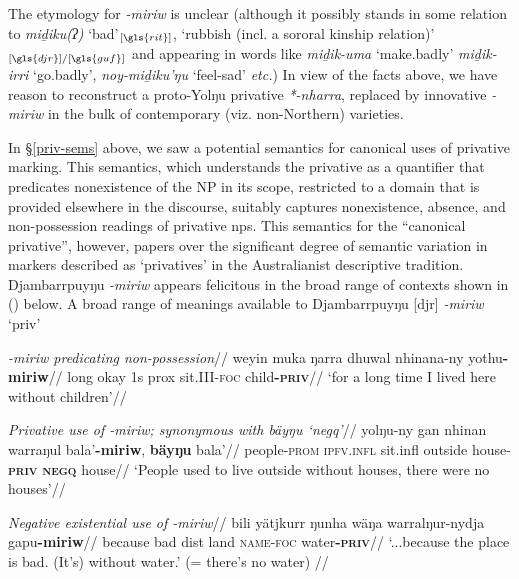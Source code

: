 \documentclass[usenames,dvipsnames,11pt]{article}
\begin{document}
{The etymology for \textit{-miriw} is unclear (although it possibly stands in some relation to \textit{miḏiku(ʔ)} `bad'$_{[\gls{rit}]}$, `rubbish (incl. a sororal kinship relation)'$_{[\gls{djr}]/[\gls{guf}]}$ and appearing in words like \textit{miḏik-uma} `make.badly' \textit{miḏik-irri} `go.badly', \textit{noy-miḏiku'ŋu} `feel-sad' \textit{etc.}) In view of the facts above, we have reason to reconstruct a proto-Yolŋu privative \textit{*-nharra}, replaced by innovative \textit{-miriw} in the bulk of contemporary (viz. non-Northern) varieties.

In §\ref{priv-sems} above, we saw a potential semantics for canonical uses of privative marking. This semantics, which understands the privative as a quantifier that predicates nonexistence of the NP in its scope, restricted to a domain that is provided elsewhere in the discourse, suitably captures nonexistence, absence, and non-possession readings of privative \gls{np}s. This semantics for the ``canonical privative'', however, papers over the significant degree of semantic variation in markers described as `privatives' in the Australianist descriptive tradition. Djambarrpuyŋu \textit{-miriw} appears felicitous in the broad range of contexts shown in (\nextx) below.
\pex A broad range of meanings available to Djambarrpuyŋu [\gls{djr}] \textit{-miriw} `\gls{priv}' 

\a\begingl\glpreamble \textit{\emph{-miriw} predicating non-possession}//
\gla weyin muka ŋarra dhuwal nhinana-ny yothu\textbf{-miriw}//
\glb long okay 1s \gls{prox} sit.III-\textsc{foc} child\textsc{\textbf{-priv}}//
\glft`for a long time I lived here without children'//\endgl

\a\begingl\glpreamble \textit{Privative use of \emph{-miriw}; synonymous with \em{bäyŋu} `\gls{negq}'}//
\gla yolŋu-ny gan nhinan warraŋul bala'\textbf{-miriw}, \textbf{bäyŋu} bala'//
\glb people-\textsc{prom} \textsc{ipfv.infl} sit.\gls{infl} outside house\textsc{-\textbf{priv}} \textsc{\textbf{negq}} house//
\glft `People used to live outside without houses, there were no houses'//
\endgl

\a\begingl\glpreamble \textit{Negative existential use of \emph{-miriw}}//
\gla bili yätjkurr ŋunha wäŋa warralŋur-nydja gapu\textbf{-miriw}//
\glb because bad \gls{dist} land \textsc{name-foc} water\textsc{\textbf{-priv}}//
\glft `...because the place is bad. (It's) without water.' (= there's no water) 		//
\endgl

}
\end{document}
